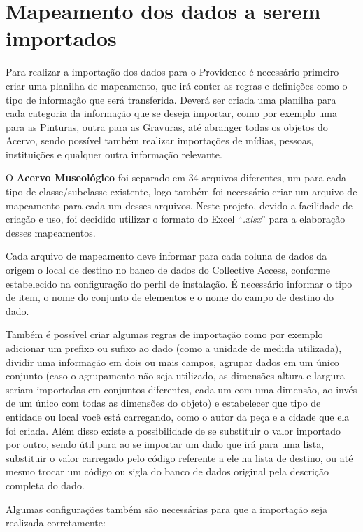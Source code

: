 \documentclass[a4paper,12pt,oneside,onecolumn,final,fleqn]{repUERJ}
\begin{document}
\section{Mapeamento dos dados a serem importados}

Para realizar a importação dos dados para o Providence é necessário primeiro criar uma planilha de mapeamento, que irá conter as regras e definições como o tipo de informação que será transferida. Deverá ser criada uma planilha para cada categoria da informação que se deseja importar, como por exemplo uma para as Pinturas, outra para as Gravuras, até abranger todas os objetos do Acervo, sendo possível também realizar importações de mídias, pessoas, instituições e qualquer outra informação relevante.

O \textbf{Acervo Museológico} foi separado em 34 arquivos diferentes, um para cada tipo de classe/subclasse existente, logo também foi necessário criar um arquivo de mapeamento para cada um desses arquivos. Neste projeto, devido a facilidade de criação e uso, foi decidido utilizar o formato do Excel ``\textit{.xlsx}'' para a elaboração desses mapeamentos.

Cada arquivo de mapeamento deve informar para cada coluna de dados da origem o local de destino no banco de dados do Collective Access, conforme estabelecido na configuração do perfil de instalação. É necessário informar o tipo de item, o nome do conjunto de elementos e o nome do campo de destino do dado.

Também é possível criar algumas regras de importação como por exemplo adicionar um prefixo ou sufixo ao dado (como a unidade de medida utilizada), dividir uma informação em dois ou mais campos, agrupar dados em um único conjunto (caso o agrupamento não seja utilizado, as dimensões altura e largura seriam importadas em conjuntos diferentes, cada um com uma dimensão, ao invés de um único com todas as dimensões do objeto) e estabelecer que tipo de entidade ou local você está carregando, como o autor da peça e a cidade que ela foi criada. Além disso existe a possibilidade de se substituir o valor importado por outro, sendo útil para ao se importar um dado que irá para uma lista, substituir o valor carregado pelo código referente a ele na lista de destino, ou até mesmo trocar um código ou sigla do banco de dados original pela descrição completa do dado.

Algumas configurações também são necessárias para que a importação seja realizada corretamente: 
\end{document}
